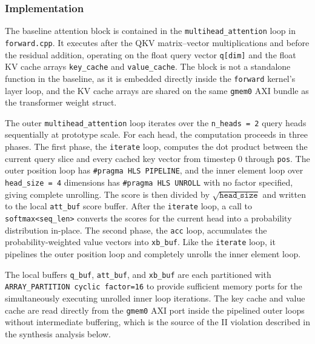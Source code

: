 \subsubsection{Implementation}
\label{subsubsec:attn_fp32_impl}

The baseline attention block is contained in the
\texttt{multihead\_attention} loop in \texttt{forward.cpp}. It executes
after the QKV matrix--vector multiplications and before the residual
addition, operating on the float query vector \texttt{q[dim]} and the
float KV cache arrays \texttt{key\_cache} and \texttt{value\_cache}.
The block is not a standalone function in the baseline, as it is embedded
directly inside the \texttt{forward} kernel's layer loop, and the KV
cache arrays are shared on the same \texttt{gmem0} AXI bundle as the
transformer weight struct.

The outer \texttt{multihead\_attention} loop iterates over the
\texttt{n\_heads = 2} query heads sequentially at prototype scale. For
each head, the computation proceeds in three phases. The first phase,
the \texttt{iterate} loop, computes the dot product between the current
query slice and every cached key vector from timestep 0 through
\texttt{pos}. The outer position loop has \texttt{\#pragma HLS
PIPELINE}, and the inner element loop over \texttt{head\_size = 4}
dimensions has \texttt{\#pragma HLS UNROLL} with no factor
specified, giving complete unrolling. The score is then divided
by $\sqrt{\texttt{head\_size}}$ and written to the local
\texttt{att\_buf} score buffer. After the \texttt{iterate} loop, a call
to \texttt{softmax<seq\_len>} converts the scores for the current head
into a probability distribution in-place. The second phase, the
\texttt{acc} loop, accumulates the probability-weighted value vectors
into \texttt{xb\_buf}. Like the \texttt{iterate} loop, it pipelines the
outer position loop and completely unrolls the inner element loop.

The local buffers \texttt{q\_buf}, \texttt{att\_buf}, and
\texttt{xb\_buf} are each partitioned with \texttt{ARRAY\_PARTITION
cyclic factor=16} to provide sufficient memory ports for the
simultaneously executing unrolled inner loop iterations. The key cache
and value cache are read directly from the \texttt{gmem0} AXI port
inside the pipelined outer loops without intermediate buffering, which
is the source of the II violation described in the synthesis analysis
below.

